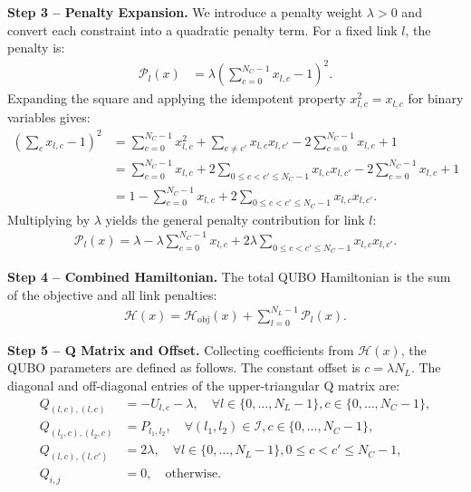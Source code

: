 \documentclass[12pt]{article}
\begin{document}
\textbf{Step 3 -- Penalty Expansion.} We introduce a penalty weight $\lambda > 0$ and convert each constraint into a quadratic penalty term. For a fixed link $l$, the penalty is:
\begin{align}
\mathcal{P}_l(x) &= \lambda \left( \sum_{c=0}^{N_C-1} x_{l,c} - 1 \right)^2.
\end{align}
Expanding the square and applying the idempotent property $x_{l,c}^2 = x_{l,c}$ for binary variables gives:
\begin{align}
\left( \sum_{c} x_{l,c} - 1 \right)^2 &= \sum_{c=0}^{N_C-1} x_{l,c}^2 + \sum_{c \neq c'} x_{l,c} x_{l,c'} - 2 \sum_{c=0}^{N_C-1} x_{l,c} + 1 \nonumber \\
&= \sum_{c=0}^{N_C-1} x_{l,c} + 2 \sum_{0 \leq c < c' \leq N_C-1} x_{l,c} x_{l,c'} - 2 \sum_{c=0}^{N_C-1} x_{l,c} + 1 \nonumber \\
&= 1 - \sum_{c=0}^{N_C-1} x_{l,c} + 2 \sum_{0 \leq c < c' \leq N_C-1} x_{l,c} x_{l,c'}.
\end{align}
Multiplying by $\lambda$ yields the general penalty contribution for link $l$:
\begin{align}
\mathcal{P}_l(x) = \lambda - \lambda \sum_{c=0}^{N_C-1} x_{l,c} + 2\lambda \sum_{0 \leq c < c' \leq N_C-1} x_{l,c} x_{l,c'}.
\end{align}

\textbf{Step 4 -- Combined Hamiltonian.} The total QUBO Hamiltonian is the sum of the objective and all link penalties:
\begin{align}
\mathcal{H}(x) = \mathcal{H}_{\text{obj}}(x) + \sum_{l=0}^{N_L-1} \mathcal{P}_l(x).
\end{align}

\textbf{Step 5 -- Q Matrix and Offset.} Collecting coefficients from $\mathcal{H}(x)$, the QUBO parameters are defined as follows. The constant offset is $c = \lambda N_L$. The diagonal and off-diagonal entries of the upper-triangular Q matrix are:
\begin{align}
Q_{(l,c),(l,c)} &= -U_{l,c} - \lambda, \quad \forall l \in \{0,\dots,N_L-1\}, c \in \{0,\dots,N_C-1\}, \nonumber \\
Q_{(l_1,c),(l_2,c)} &= P_{l_1,l_2}, \quad \forall (l_1,l_2) \in \mathcal{I}, c \in \{0,\dots,N_C-1\}, \nonumber \\
Q_{(l,c),(l,c')} &= 2\lambda, \quad \forall l \in \{0,\dots,N_L-1\}, 0 \leq c < c' \leq N_C-1, \nonumber \\
Q_{i,j} &= 0, \quad \text{otherwise}.
\end{align}
\end{document}
